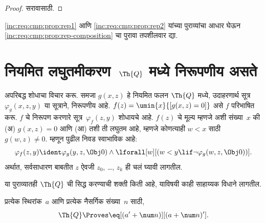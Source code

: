 \begin{proof}
सरावासाठी.
\end{proof}

\begin{prob}
\ref{inc:req:cmp:prop:rep1} आणि
\ref{inc:req:cmp:prop:rep2} यांच्या पुराव्यांचा आधार घेऊन
\ref{inc:req:cmp:prop:rep-composition} चा पुरावा तपशीलवार द्या.
\end{prob}











\section{नियमित लघुतमीकरण~$\Th{Q}$ मध्ये निरूपणीय असते}\label{inc:req:min:sec}

अपरिबद्ध शोधाचा विचार करू. समजा $g(x, z)$ हे नियमित फलन
$\Th{Q}$ मध्ये, उदाहरणार्थ सूत्र~$\varphi_g(x, z, y)$ या
सूत्राने, निरूपणीय आहे. $f(z) = \umin{x}{[g(x, z) = 0]}$
असे $f$ परिभाषित करू. $f$ चे निरूपण करणारे
सूत्र~$\varphi_f(z, y)$ शोधायचे आहे. $f(z)$ चे मूल्य
म्हणजे अशी संख्या~$x$ की (अ) $g(x, z) = 0$ आणि (आ) तशी
ती लघुतम आहे, म्हणजे कोणत्याही $w < x$ साठी
$g(w, z) \neq 0$. म्हणून पुढील निवड स्वाभाविक आहे:
\[\varphi_f(z,y) \ident \varphi_g(y, z, \Obj 0) \land \lforall[w][(w < y \lif \lnot
  \varphi_g(w, z, \Obj 0))].
\]
अर्थात, सर्वसाधारण बाबतीत $z$ ऐवजी $z_0$, \dots, $z_k$
ही चलं घ्यावी लागतील.

या पुराव्यातही $\Th{Q}$ ची सिद्ध करण्याची शक्ती किती आहे,
याविषयी काही साहाय्यक विधाने लागतील.

\begin{lem}
\label{inc:req:min:lem:succ} प्रत्येक स्थिरांक~$a$ आणि प्रत्येक नैसर्गिक
संख्या~$n$ साठी,
\[\Th{Q} \Proves \eq[(a' + \num n)][(a + \num n)'].
\]
\end{lem}

